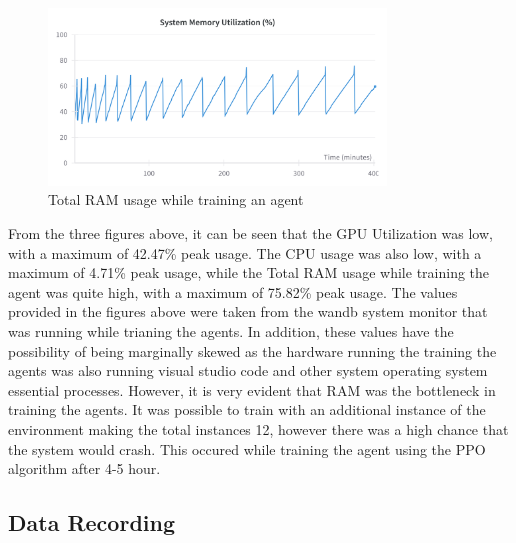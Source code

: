 \begin{figure}[H]
    \centering
    \includegraphics[width=0.8\textwidth]{figures/System_RAM_Utilization.png}
    \caption{Total RAM usage while training an agent}
    \label{fig:sys_memory_useage}
\end{figure}

From the three figures above, it can be seen that the GPU Utilization was low, with a maximum of 42.47\% peak usage. The CPU usage was also low, with a maximum of 4.71\% peak usage, while the Total RAM usage while training the agent was quite high, with a maximum of 75.82\% peak usage. The values provided in the figures above were taken from the wandb system monitor that was running while trianing the agents. In addition, these values have the possibility of being marginally skewed as the hardware running the training the agents was also running visual studio code and other system operating system essential processes. However, it is very evident that RAM was the bottleneck in training the agents. It was possible to train with an additional instance of the environment making the total instances 12, however there was a high chance that the system would crash. This occured while training the agent using the PPO algorithm after 4-5 hour. 

\subsection{Data Recording}

